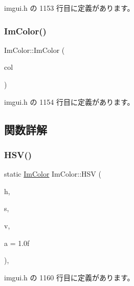  imgui.\+h の 1153 行目に定義があります。

\mbox{\label{struct_im_color_aa5306926b3ef766a8647b26bdfd9f8d2}} 
\subsubsection{\texorpdfstring{Im\+Color()}{ImColor()}\hspace{0.1cm}{\footnotesize\ttfamily [5/5]}}
{\footnotesize\ttfamily Im\+Color\+::\+Im\+Color (\begin{DoxyParamCaption}\item[{const \mbox{\hyperlink{struct_im_vec4}{Im\+Vec4}} \&}]{col }\end{DoxyParamCaption})\hspace{0.3cm}{\ttfamily [inline]}}



 imgui.\+h の 1154 行目に定義があります。



\subsection{関数詳解}
\mbox{\label{struct_im_color_ac8cb52119648523038818a613becf010}} 
\subsubsection{\texorpdfstring{H\+S\+V()}{HSV()}}
{\footnotesize\ttfamily static \mbox{\hyperlink{struct_im_color}{Im\+Color}} Im\+Color\+::\+H\+SV (\begin{DoxyParamCaption}\item[{float}]{h,  }\item[{float}]{s,  }\item[{float}]{v,  }\item[{float}]{a = {\ttfamily 1.0f} }\end{DoxyParamCaption})\hspace{0.3cm}{\ttfamily [inline]}, {\ttfamily [static]}}



 imgui.\+h の 1160 行目に定義があります。

\mbox{\label{struct_im_color_a4f4fc53e0676d50404d6d5ffcf16637f}} 
